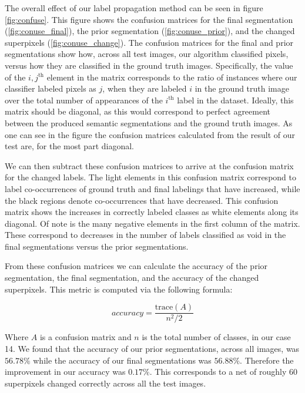 \documentclass{article} %
\begin{document}
The overall effect of our label propagation method can be seen in figure \ref{fig:confuse}. This figure shows the confusion matrices for the final segmentation (\ref{fig:conuse_final}), the prior segmentation (\ref{fig:conuse_prior}), and the changed superpixels (\ref{fig:conuse_change}). The confusion matrices for the final and prior segmentations show how, across all test images, our algorithm classified pixels, versus how they are classified in the ground truth images. Specifically, the value  of the $i,j^\textrm{th}$ element in the matrix corresponds to the ratio of instances where our classifier labeled pixels as $j$, when they are labeled $i$ in the ground truth image over the total number of appearances of the $i^\textrm{th}$ label in the dataset. Ideally, this matrix should be diagonal, as this would correspond to perfect agreement between the produced semantic segmentations and the ground truth images. As one can see in the figure the confusion matrices calculated from the result of our test are, for the most part diagonal. 

We can then subtract these confusion matrices to arrive at the confusion matrix for the changed labels. The light elements in this confusion matrix correspond to label co-occurrences of ground truth and final labelings that have increased, while the black regions denote co-occurrences that have decreased. This confusion matrix shows the increases in correctly labeled classes as white elements along its diagonal. Of note is the many negative elements in the first column of the matrix. These correspond to decreases in the number of labels classified as void in the final segmentations versus the prior segmentations.

From these confusion matrices we can calculate the accuracy of the prior segmentation, the final segmentation, and the accuracy of the changed superpixels. This metric is computed via the following formula:

\begin{equation}
	accuracy = \frac{\mathrm{trace}(A)}{n^2/2}
\end{equation}

Where $A$ is a confusion matrix and $n$ is the total number of classes, in our case 14. We found that the accuracy of our prior segmentations, across all images, was $56.78\%$ while the accuracy of our final segmentations was $56.88\%$. Therefore the improvement in our accuracy was $0.17\%$. This corresponds to a net of roughly 60 superpixels changed correctly across all the test images.
\end{document}
